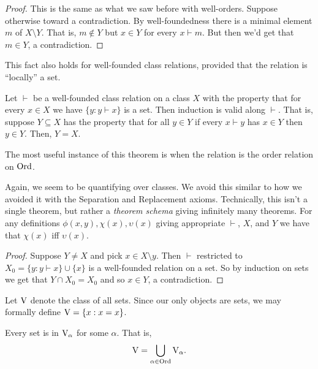 \documentclass[10pt]{amsart}
\begin{document}
\begin{proof}
This is the same as what we saw before with well-orders. Suppose otherwise toward a contradiction. By well-foundedness there is a minimal element $m$ of $X \setminus Y$. That is, $m \not \in Y$ but $x \in Y$ for every $x \vdash m$. But then we'd get that $m \in Y$, a contradiction.
\end{proof}

This fact also holds for well-founded class relations, provided that the relation is ``locally'' a set.

\begin{theorem}
Let $\vdash$ be a well-founded class relation on a class $X$ with the property that for every $x \in X$ we have $\{ y : y \vdash x \}$ is a set. Then induction is valid along $\vdash$. That is, suppose $Y \subseteq X$ has the property that for all $y \in Y$ if every $x \vdash y$ has $x \in Y$ then $y \in Y$. Then, $Y = X$.
\end{theorem}

The most useful instance of this theorem is when the relation is the order relation on $\mathrm{Ord}$.

\begin{remark}
Again, we seem to be quantifying over classes. We avoid this similar to how we avoided it with the Separation and Replacement axioms. Technically, this isn't a single theorem, but rather a \emph{theorem schema} giving infinitely many theorems. For any definitions $\phi(x,y), \chi(x), \upsilon(x)$ giving appropriate $\vdash$, $X$, and $Y$ we have that $\chi(x)$ iff $\upsilon(x)$.
\end{remark}

\begin{proof}
Suppose $Y \ne X$ and pick $x \in X \setminus y$. Then $\vdash$ restricted to $X_0 = \{ y : y \vdash x \} \cup \{x\}$ is a well-founded relation on a set. So by induction on sets we get that $Y \cap X_0 = X_0$ and so $x \in Y$, a contradiction.
\end{proof}

\begin{definition}
Let $\mathrm{V}$ denote the class of all sets. Since our only objects are sets, we may formally define $\mathrm{V} = \{ x : x = x \}$.
\end{definition}

\begin{theorem}[In $\ZF$]
Every set is in $\mathrm{V}_\alpha$ for some $\alpha$. That is, 
\[
\mathrm{V} = \bigcup_{\alpha \in \mathrm{Ord}} \mathrm{V}_\alpha.
\]
\end{theorem}
\end{document}
